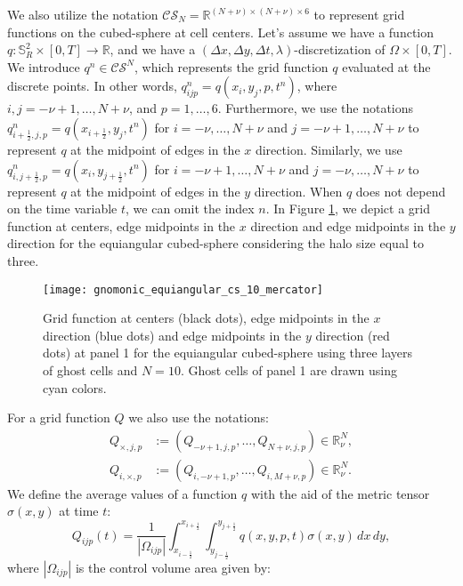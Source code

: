 We also utilize the notation $\mathcal{CS}_N=\mathbb{R}^{(N+\nu)\times(N+\nu)\times 6}$
to represent grid functions on the cubed-sphere at cell centers.
Let's assume we have a function $q:\mathbb{S}^2_R\times[0,T] \to \mathbb{R}$, 
and we have a $(\Delta x, \Delta y, \Delta t, \lambda)$-discretization of $\Omega \times [0,T]$.
We introduce $q^n \in \mathcal{CS}^N$, which represents the grid function $q$
evaluated at the discrete points. 
In other words, $q^n_{ijp} = q(x_i,y_j,p,t^n)$, where $i,j=-\nu +1, \ldots, N+\nu$, and $p=1, \ldots, 6$.
Furthermore, we use the notations $q^n_{i+\frac{1}{2},j,p} = q(x_{i+\frac{1}{2}},y_j, t^n)$ 
for $i=-\nu, \ldots, N+\nu$ and $j=-\nu +1, \ldots, N+\nu$ to represent $q$ at the midpoint of edges in
the $x$ direction.
Similarly, we use $q^n_{i,j+\frac{1}{2},p} = q(x_i,y_{j+\frac{1}{2}},t^n)$ for $i=-\nu +1, \ldots, N+\nu$ and $j=-\nu, \ldots, N+\nu$ to represent $q$ at the midpoint of edges in the $y$ direction.
When $q$ does not depend on the time variable $t$, we can omit the index $n$.
In Figure \ref{chp4-cs-grid-function}, we depict a grid function at centers, edge midpoints in the $x$ direction
and edge midpoints in the $y$ direction for the equiangular cubed-sphere considering
the halo size equal to three.
\begin{figure}[!htb]
	\centering
	\texttt{[image: gnomonic\_equiangular\_cs\_10\_mercator]}
	\caption{Grid function at centers (black dots), edge midpoints in the $x$ direction (blue dots)
        and edge midpoints in the $y$ direction (red dots) at panel 1
        for the equiangular cubed-sphere using three layers of ghost cells and $N=10$.
        Ghost cells of panel 1 are drawn using cyan colors.
	\label{chp4-cs-grid-function}}
\end{figure}
For a grid function $Q$ we also use the notations:
\begin{align*}
	Q_{\times,j,p} &:= (Q_{-\nu+1,j,p}, \ldots, Q_{N+\nu,j,p}) \in \mathbb{R}^{N}_{\nu},\\
	Q_{i,\times,p} &:= (Q_{i,-\nu+1,p}, \ldots, Q_{i,M+\nu,p}) \in \mathbb{R}^{N}_{\nu}.
\end{align*}
We define the average values of a function $q$ with the aid of the metric tensor
$\sigma(x,y)$ at time $t$: 
\begin{equation*}
	Q_{ijp}(t) = \frac{1}{|\Omega_{ijp}|}\int_{x_{i-\frac{1}{2}}}^{x_{i+\frac{1}{2}}}
	\int_{y_{j-\frac{1}{2}}}^{y_{j+\frac{1}{2}}}  q(x,y,p,t) {\sigma(x,y)}\,dx \,dy,
\end{equation*}
where $|\Omega_{ijp}|$ is the control volume area given by:

